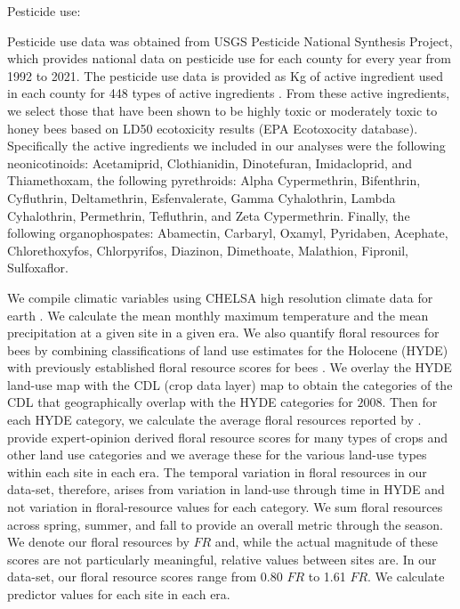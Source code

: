 \documentclass[12pt]{article}
\begin{document}
Pesticide use: 

Pesticide use data was obtained from USGS Pesticide National Synthesis Project, which provides national data on pesticide use for each county for every year from 1992 to 2021. The pesticide use data is provided as Kg of active ingredient used in each county for 448 types of active ingredients \citep{baker2015estimated, thelin2013estimation}. From these active ingredients, we select those that have been shown to be highly toxic or moderately toxic to honey bees based on LD50 ecotoxicity results (EPA Ecotoxocity database). Specifically the active ingredients we included in our analyses were the following neonicotinoids: Acetamiprid, Clothianidin, Dinotefuran, Imidacloprid, and Thiamethoxam, the following pyrethroids: Alpha Cypermethrin, Bifenthrin, Cyfluthrin, Deltamethrin, Esfenvalerate, Gamma Cyhalothrin, Lambda Cyhalothrin, Permethrin, Tefluthrin, and Zeta Cypermethrin. Finally, the following organophospates: Abamectin, Carbaryl, Oxamyl, Pyridaben, Acephate, Chlorethoxyfos, Chlorpyrifos, Diazinon, Dimethoate, Malathion, Fipronil, Sulfoxaflor. 







We compile climatic variables using CHELSA high resolution climate data for earth \citep{karger2017climatologies, karger2018chelsacruts}. We calculate the mean monthly maximum temperature and the mean precipitation at a given site in a given era. We also quantify floral resources for bees by combining classifications of land use estimates for the Holocene (HYDE) \citep{klein2017anthropogenic} with previously established floral resource scores for bees \citep{koh2016modeling}. We overlay the HYDE land-use map with the CDL (crop data layer) map to obtain the categories of the CDL that geographically overlap with the HYDE categories for $2008$. Then for each HYDE category, we calculate the average floral resources reported by \citet{koh2016modeling}. \citet{koh2016modeling} provide expert-opinion derived floral resource scores for many types of crops and other land use categories and we average these for the various land-use types within each site in each era. The temporal variation in floral resources in our data-set, therefore, arises from variation in land-use through time in HYDE and not variation in floral-resource values for each category. We sum floral resources across spring, summer, and fall to provide an overall metric through the season. We denote our floral resources by $FR$ and, while the actual magnitude of these scores are not particularly meaningful, relative values between sites are. In our data-set, our floral resource scores range from 0.80 $FR$ to 1.61 $FR$. We calculate predictor values for each site in each era. 
\end{document}
